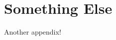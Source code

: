 \documentclass[../../main.tex]{subfiles}  %
\begin{document}

\section{Something Else}
Another appendix!
\end{document}

